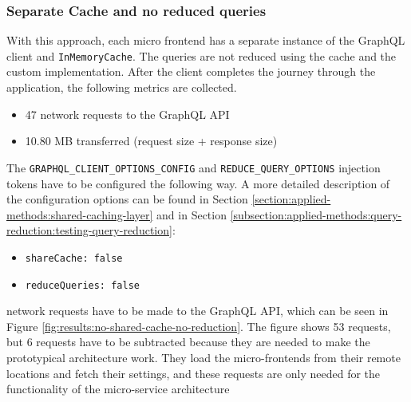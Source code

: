 \subsubsection{Separate Cache and no reduced queries}\label{subsubsection:results:performance-measurement:separate-cache-no-reduction}

With this approach, each micro frontend has a separate instance of the GraphQL client and \texttt{InMemoryCache}. The queries are not reduced using the cache and the custom implementation. After the client completes the journey through the application, the following metrics are collected.

\begin{itemize}
  \item 47 network requests to the GraphQL \ac{API}
  \item 10.80 MB transferred (request size + response size)
\end{itemize}

\noindent The \texttt{GRAPHQL\_CLIENT\_OPTIONS\_CONFIG} and \texttt{REDUCE\_QUERY\_OPTIONS} injection tokens have to be configured the following way. A more detailed description of the configuration options can be found in Section \ref{section:applied-methods:shared-caching-layer} and in Section \ref{subsection:applied-methods:query-reduction:testing-query-reduction}:

\begin{itemize}
  \item \texttt{shareCache: false}
  \item \texttt{reduceQueries: false}
\end{itemize}

 network requests have to be made to the GraphQL \ac{API}, which can be seen in Figure \ref{fig:results:no-shared-cache-no-reduction}. The figure shows 53 requests, but 6 requests have to be subtracted because they are needed to make the prototypical architecture work. They load the micro-frontends from their remote locations and fetch their settings, and these requests are only needed for the functionality of the micro-service architecture

